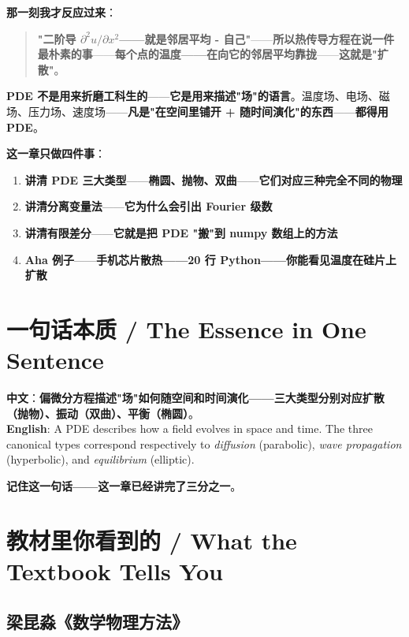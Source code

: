 \textbf{那一刻我才反应过来}：

\begin{quote}
\textbf{"二阶导 $\partial^2 u / \partial x^2$——就是\textbf{邻居平均 - 自己}"}——\textbf{所以热传导方程在说一件最朴素的事}——\textbf{每个点的温度——在向它的邻居平均靠拢}——\textbf{这就是"扩散"}。
\end{quote}

\textbf{PDE 不是用来折磨工科生的}——\textbf{它是用来描述"场"的语言}。温度场、电场、磁场、压力场、速度场——\textbf{凡是"在空间里铺开 + 随时间演化"的东西}——\textbf{都得用 PDE}。

\textbf{这一章只做四件事}：

\begin{enumerate}
\item \textbf{讲清 PDE 三大类型}——\textbf{椭圆、抛物、双曲}——\textbf{它们对应三种完全不同的物理}
\item \textbf{讲清分离变量法}——\textbf{它为什么会引出 Fourier 级数}
\item \textbf{讲清有限差分}——\textbf{它就是把 PDE "搬"到 numpy 数组上的方法}
\item \textbf{Aha 例子}——\textbf{手机芯片散热——20 行 Python——你能看见温度在硅片上扩散}
\end{enumerate}

\section{一句话本质 / The Essence in One Sentence}

\begin{tcolorbox}[essbox={一句话本质}]
\textbf{中文}：\textbf{偏微分方程描述"场"如何随空间和时间演化——三大类型分别对应\textbf{扩散}（抛物）、\textbf{振动}（双曲）、\textbf{平衡}（椭圆）}。\\[6pt]
\textbf{English}: A PDE describes how a field evolves in space and time. The three canonical types correspond respectively to \emph{diffusion} (parabolic), \emph{wave propagation} (hyperbolic), and \emph{equilibrium} (elliptic).
\end{tcolorbox}

\textbf{记住这一句话——这一章已经讲完了三分之一}。

\section{教材里你看到的 / What the Textbook Tells You}

\subsection{梁昆淼《数学物理方法》}

